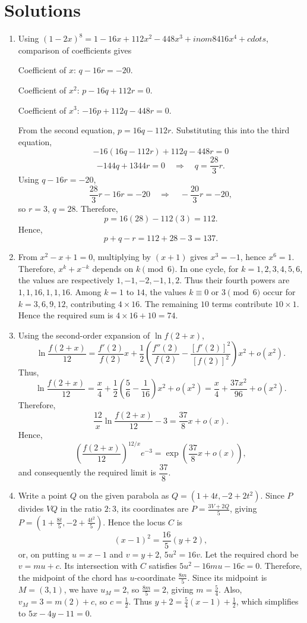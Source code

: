 \documentclass[11pt,a4paper]{article}
\begin{document}
\section*{Solutions}
\begin{enumerate}
\item Using $(1-2x)^8=1-16x+112x^2-448x^3+inom{8}{4}16x^4+cdots$, comparison of coefficients gives

Coefficient of $x$: $q-16r=-20$.

Coefficient of $x^2$: $p-16q+112r=0$.

Coefficient of $x^3$: $-16p+112q-448r=0$.

From the second equation, $p=16q-112r$. Substituting this into the third equation,
\[
-16(16q-112r)+112q-448r=0
\]
\[
-144q+1344r=0\quad\Rightarrow\quad q=\frac{28}{3}r.
\]
Using $q-16r=-20$,
\[
\frac{28}{3}r-16r=-20\quad\Rightarrow\quad -\frac{20}{3}r=-20,
\]
so $r=3$, $q=28$. Therefore,
\[
p=16(28)-112(3)=112.
\]
Hence,
\[
p+q-r=112+28-3=137.
\]
\item From $x^2-x+1=0$, multiplying by $(x+1)$ gives $x^3=-1$, hence $x^6=1$. Therefore, $x^k+x^{-k}$ depends on $k\pmod 6$. In one cycle, for $k=1,2,3,4,5,6$, the values are respectively $1,-1,-2,-1,1,2$. Thus their fourth powers are $1,1,16,1,1,16$. Among $k=1$ to $14$, the values $k\equiv 0$ or $3\pmod 6$ occur for $k=3,6,9,12$, contributing $4\times16$. The remaining $10$ terms contribute $10\times1$. Hence the required sum is $4\times16+10=74$.
\item Using the second-order expansion of $\ln f(2+x)$,
\[
\ln\frac{f(2+x)}{12}=\frac{f'(2)}{f(2)}x+\frac12\left(\frac{f''(2)}{f(2)}-\frac{[f'(2)]^2}{[f(2)]^2}\right)x^2+o(x^2).
\]
Thus,
\[
\ln\frac{f(2+x)}{12}=\frac{x}{4}+\frac12\left(\frac56-\frac1{16}\right)x^2+o(x^2)=\frac{x}{4}+\frac{37x^2}{96}+o(x^2).
\]
Therefore,
\[
\frac{12}{x}\ln\frac{f(2+x)}{12}-3=\frac{37}{8}x+o(x).
\]
Hence,
\[
\left(\frac{f(2+x)}{12}\right)^{12/x}e^{-3}=\exp\left(\frac{37}{8}x+o(x)\right),
\]
and consequently the required limit is $\dfrac{37}{8}$.
\item Write a point $Q$ on the given parabola as $Q=(1+4t,-2+2t^2)$. Since $P$ divides $VQ$ in the ratio $2:3$, its coordinates are $P=\frac{3V+2Q}{5}$, giving $P=\left(1+\frac{8t}{5},-2+\frac{4t^2}{5}\right)$. Hence the locus $C$ is $$(x-1)^2=\frac{16}{5}(y+2),$$ or, on putting $u=x-1$ and $v=y+2$, $5u^2=16v$. Let the required chord be $v=mu+c$. Its intersection with $C$ satisfies $5u^2-16mu-16c=0$. Therefore, the midpoint of the chord has $u$-coordinate $\frac{8m}{5}$. Since its midpoint is $M=(3,1)$, we have $u_M=2$, so $\frac{8m}{5}=2$, giving $m=\frac54$. Also, $v_M=3=m(2)+c$, so $c=\frac12$. Thus $y+2=\frac54(x-1)+\frac12$, which simplifies to $\boxed{5x-4y-11=0}$.

\end{enumerate}
\end{document}

